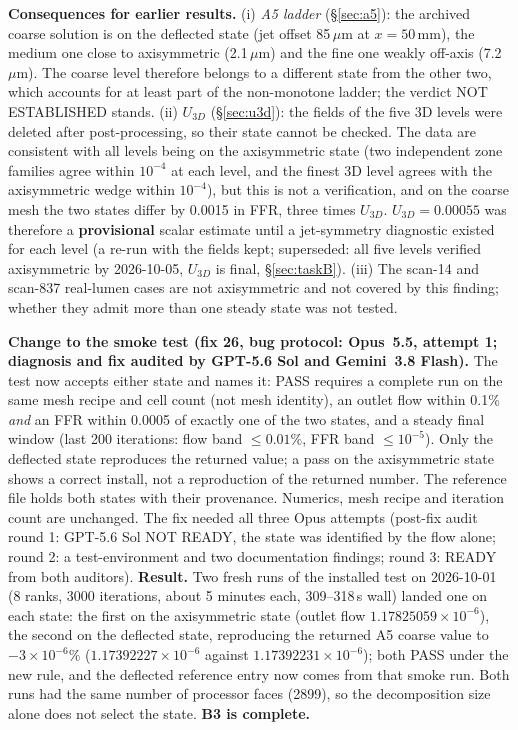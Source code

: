 \documentclass[11pt]{article}
\begin{document}
\textbf{Consequences for earlier results.} (i) \emph{A5 ladder} (\S\ref{sec:a5}): the archived coarse solution is on the deflected state (jet offset 85\,$\mu$m at $x=50$\,mm), the medium one close to axisymmetric (2.1\,$\mu$m) and the fine one weakly off-axis (7.2\,$\mu$m). The coarse level therefore belongs to a different state from the other two, which accounts for at least part of the non-monotone ladder; the verdict NOT ESTABLISHED stands. (ii) \emph{$U_{3D}$} (\S\ref{sec:u3d}): the fields of the five 3D levels were deleted after post-processing, so their state cannot be checked. The data are consistent with all levels being on the axisymmetric state (two independent zone families agree within $10^{-4}$ at each level, and the finest 3D level agrees with the axisymmetric wedge within $10^{-4}$), but this is not a verification, and on the coarse mesh the two states differ by 0.0015 in FFR, three times $U_{3D}$. $U_{3D}=0.00055$ was therefore a \textbf{provisional} scalar estimate until a jet-symmetry diagnostic existed for each level (a re-run with the fields kept; superseded: all five levels verified axisymmetric by 2026-10-05, $U_{3D}$ is final, \S\ref{sec:taskB}). (iii) The scan-14 and scan-837 real-lumen cases are not axisymmetric and not covered by this finding; whether they admit more than one steady state was not tested.

\textbf{Change to the smoke test (fix 26, bug protocol: Opus~5.5, attempt 1; diagnosis and fix audited by GPT-5.6 Sol and Gemini~3.8 Flash).} The test now accepts either state and names it: PASS requires a complete run on the same mesh recipe and cell count (not mesh identity), an outlet flow within 0.1\% \emph{and} an FFR within 0.0005 of exactly one of the two states, and a steady final window (last 200 iterations: flow band $\leq0.01\%$, FFR band $\leq10^{-5}$). Only the deflected state reproduces the returned value; a pass on the axisymmetric state shows a correct install, not a reproduction of the returned number. The reference file holds both states with their provenance. Numerics, mesh recipe and iteration count are unchanged. The fix needed all three Opus attempts (post-fix audit round 1: GPT-5.6 Sol NOT READY, the state was identified by the flow alone; round 2: a test-environment and two documentation findings; round 3: READY from both auditors). \textbf{Result.} Two fresh runs of the installed test on 2026-10-01 (8 ranks, 3000 iterations, about 5 minutes each, 309--318\,s wall) landed one on each state: the first on the axisymmetric state (outlet flow $1.17825059\times10^{-6}$), the second on the deflected state, reproducing the returned A5 coarse value to $-3\times10^{-6}\%$ ($1.17392227\times10^{-6}$ against $1.17392231\times10^{-6}$); both PASS under the new rule, and the deflected reference entry now comes from that smoke run. Both runs had the same number of processor faces (2899), so the decomposition size alone does not select the state. \textbf{B3 is complete.}
\end{document}
